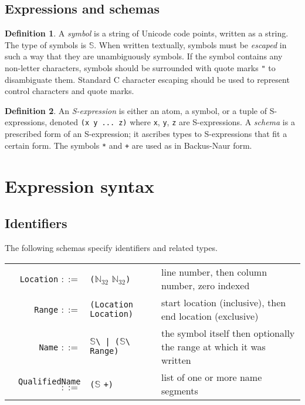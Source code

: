\documentclass[UKenglish, 11pt, a4paper, parskip=half]{scrbook}
\newcommand{\code}[1]{\lstinline{#1}}
\theoremstyle{definition}
\newtheorem*{definition}{Definition}
\begin{document}
\subsection{Expressions and schemas}
\begin{definition}
    A \textit{symbol} is a string of Unicode code points, written as a string.
    The type of symbols is \( \mathbb S \).
    When written textually, symbols must be \textit{escaped} in such a way that they are unambiguously symbols.
    If the symbol contains any non-letter characters, symbols should be surrounded with quote marks \code{"} to disambiguate them.
    Standard C character escaping should be used to represent control characters and quote marks.
\end{definition}
\begin{definition}
    An \textit{S-expression} is either an atom, a symbol, or a tuple of S-expressions, denoted \code{(x y ... z)} where \code{x}, \code{y}, \code{z} are S-expressions.
    A \textit{schema} is a prescribed form of an S-expression; it ascribes types to S-expressions that fit a certain form.
    The symbols \code{*} and \code{+} are used as in Backus-Naur form.
\end{definition}

\section{Expression syntax}

\subsection{Identifiers}

The following schemas specify identifiers and related types.

\begin{tabular}{r l p{6cm}}
    \code{Location} \( ::= \) & \code{(}\( \mathbb N_{32} \) \( \mathbb N_{32} \)\code{)} & line number, then column number, zero indexed \\
    \code{Range} \( ::= \) & \code{(Location Location)} & start location (inclusive), then end location (exclusive) \\
    \code{Name} \( ::= \) & \( \mathbb S \)\code{\ | (}\( \mathbb S \)\code{\ Range)} & the symbol itself then optionally the range at which it was written \\
    \code{QualifiedName} \( ::= \) & \code{(}\( \mathbb S \) \code{+)} & list of one or more name segments
\end{tabular}
\end{document}
